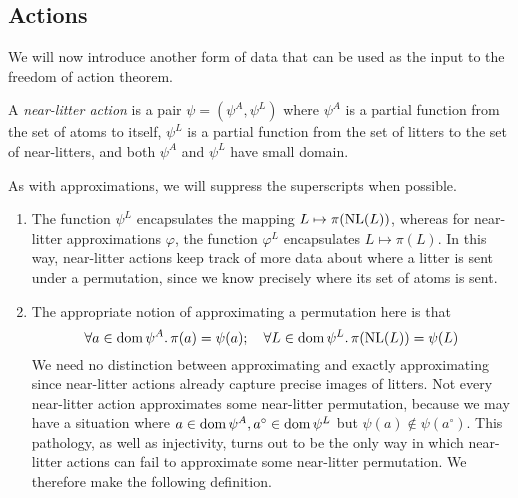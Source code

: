 \subsection{Actions}

We will now introduce another form of data that can be used as the input to the freedom of action theorem.

\begin{definition}
    A \emph{near-litter action} is a pair \( \psi = (\psi^A, \psi^L) \) where \( \psi^A \) is a partial function from the set of atoms to itself, \( \psi^L \) is a partial function from the set of litters to the set of near-litters, and both \( \psi^A \) and \( \psi^L \) have small domain.
\end{definition}

As with approximations, we will suppress the superscripts when possible.

\begin{remarks}\mbox{\negthinspace}
    \begin{enumerate}
        \item The function \( \psi^L \) encapsulates the mapping \( L \mapsto \pi(\operatorname{NL}(L)) \), whereas for near-litter approximations \( \varphi \), the function \( \varphi^L \) encapsulates \( L \mapsto \pi(L) \).
        In this way, near-litter actions keep track of more data about where a litter is sent under a permutation, since we know precisely where its set of atoms is sent.
        \item The appropriate notion of approximating a permutation here is that
        \[ \forall a \in \operatorname{dom} \psi^A.\, \pi(a) = \psi(a);\quad \forall L \in \operatorname{dom} \psi^L.\, \pi(\operatorname{NL}(L)) = \psi(L) \]
        We need no distinction between approximating and exactly approximating since near-litter actions already capture precise images of litters.
        Not every near-litter action approximates some near-litter permutation, because we may have a situation where \( a \in \operatorname{dom} \psi^A, a^\circ \in \operatorname{dom} \psi^L \) but \( \psi(a) \notin \psi(a^\circ) \).
        This pathology, as well as injectivity, turns out to be the only way in which near-litter actions can fail to approximate some near-litter permutation.
        We therefore make the following definition.
    \end{enumerate}
\end{remarks}

